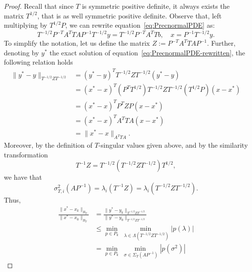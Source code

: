 \documentclass[10pt,a4paper]{amsart}
\newcommand{\bb}[1]{#1}
\begin{document}
\begin{proof}
    Recall that since $T$ is symmetric positive definite, it always exists the matrix $T^{1/2}$, that is as well symmetric positive definite. Observe that, \bb{left multiplying by}  $T^{1/2}P$, we can rewrite equation~\eqref{eq:PrecnormalPDE} as:
    \begin{equation}
        \label{eq:PrecnormalPDE-rewritten}
        T^{-1/2}P^{-T}A^T T A P^{-1} T^{-1/2} y = T^{-1/2}P^{-T}A^T Tb, \quad x=P^{-1}T^{-1/2}y.
    \end{equation}
    To simplify the notation, let us define the matrix $Z := P^{-T}A^T T A P^{-1}$.
    Further, denoting by $y^*$ the exact solution of equation~\eqref{eq:PrecnormalPDE-rewritten}, the following relation holds
    \begin{equation}
        \begin{aligned}
            \|y^*- y\|_{T^{-1/2}Z T^{-1/2}} & = (y^*-y)^TT^{-1/2}Z T^{-1/2}(y^*-y)                         \\
                                            & = (x^*-x)^T(P^T T^{1/2}) T^{-1/2}Z T^{-1/2}(T^{1/2}P)(x-x^*) \\
                                            & = (x^*-x)^T P^T Z P(x-x^*)                                   \\
                                            & = (x^*-x)^T A^TTA(x-x^*)                                     \\
                                            & = \|x^*-x\|_{A^TTA}.
        \end{aligned}
    \end{equation}
    Moreover, by the definition of $T$-singular values given above, and by the similarity transformation
    \begin{equation}
        T^{-1}Z = T^{-1/2}(T^{-1/2}ZT^{-1/2})T^{1/2},
    \end{equation}
    we have that
    \begin{equation}
        \label{eq:singVsEige}
        \sigma^2_{T,i}\left(AP^{-1}\right) = \lambda_i\left(T^{-1}Z\right) = \lambda_i \left( T^{-1/2}ZT^{-1/2} \right).
    \end{equation}
    Thus,
    \begin{equation}
        \begin{aligned}
            \frac{\|x^* - x_k \|_{B_T}}{\|x^* - x_0 \|_{B_T}} & = \frac{\|y^* - y_k\|_{T^{-1/2}ZT^{-1/2}}}{\|y^* - y_0\|_{T^{-1/2}ZT^{-1/2}}}                                     \\
                                                              & \leq \underset{p\in P_k}{\bb{\min}} \underset{\,\,\lambda \in \Lambda(T^{-1/2}ZT^{-1/2})}{\bb{\min}} |p(\lambda)| \\
                                                              & = \underset{p\in P_k}{\bb{\min}} \underset{\,\,\sigma \in \Sigma_T(AP^{-1})}{\bb{\min}} |p(\sigma^2)|
        \end{aligned}
    \end{equation}


\end{proof}
\end{document}
